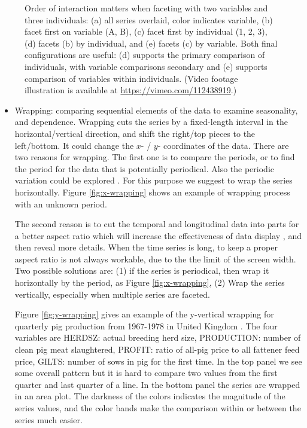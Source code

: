 \documentclass[12pt]{article}
\begin{document}
\begin{center}
\begin{figure}[htp]
\caption{\label{fig:faceting-var-ind}Order of interaction matters when faceting with two variables and three individuals: (a) all series overlaid, color indicates variable, (b) facet first on variable (A, B),  (c) facet first by individual (1, 2, 3), (d) facets (b) by individual, and (e) facets (c) by variable. Both final configurations are useful: (d) supports the primary comparison of individuals, with variable comparisons secondary and (e) supports comparison of variables within individuals.  (Video footage illustration is available at \url{https://vimeo.com/112438919}.)}
\end{figure}

\end{center}



\begin{itemize} \itemsep 0in

\item Wrapping: comparing sequential elements of the
data to examine seasonality, and dependence.
Wrapping cuts the series by a fixed-length interval in
the horizontal/vertical direction, and shift the right/top pieces
to the left/bottom. It could change the $x$- / $y$- coordinates of the
data.
There are two reasons for wrapping. The first one
is to compare the periods, or to find the period for the data
that is potentially periodical. Also the periodic variation
could be explored \citep{mcdonald1986periodic}. For this
purpose we suggest to wrap the series horizontally.
Figure \ref{fig:x-wrapping}
shows an example of wrapping process with an unknown period.

The second reason is to cut the temporal and longitudinal data into
parts for a better aspect ratio which will increase the effectiveness
of data display \citep{cleveland1987graphical}, and then reveal more
details. When the time series is long, to keep a proper aspect ratio
is not always workable, due to the the limit of the screen width.
Two possible solutions are:  (1) if the series is periodical, then wrap
it horizontally by the period, as Figure %
\ref{fig:x-wrapping},  (2) Wrap the series vertically, especially
when multiple series are faceted.

Figure \ref{fig:y-wrapping} gives an example of the y-vertical wrapping
for quarterly pig production from 1967-1978 in United Kingdom \citep{andrews1985data}.
The four variables are HERDSZ: actual breeding herd size, PRODUCTION:
number of clean pig meat slaughtered, PROFIT: ratio of all-pig price
to all fattener feed price, GILTS: number of sows in pig for the first
time. In the top panel we see some overall pattern but it is hard
to compare two values from the first quarter and last quarter of a
line. In the bottom panel the series are wrapped in an area plot.
The darkness of the colors indicates the magnitude of the series values,
and the color bands make the comparison within or between the series
much easier. 




\end{itemize}
\end{document}
